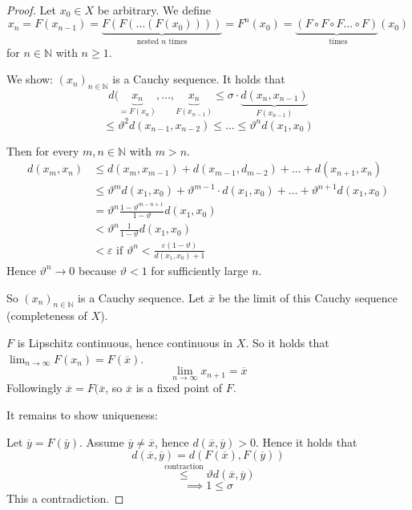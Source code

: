 \documentclass[a4paper,landscape,twocolumn]{article}
\theoremstyle{definition}
\begin{document}
\begin{proof}
  Let $x_0 \in X$ be arbitrary.
  We define
  \[
  x_n = F(x_{n-1}) = \underbrace{F(F(\ldots(F(x_0))))}_{\text{nested } n \text{ times}}
  = F^{n}(x_0) = \underbrace{(F \circ F \circ F \ldots \circ F)}_{ \text{ times}}(x_0)
  \]
  for $n \in \mathbb N$ with $n \geq 1$.

  We show: $(x_n)_{n\in\mathbb N}$ is a Cauchy sequence. It holds that
  \[ d(\underbrace{x_n}_{=F(x_n)}, \ldots, \underbrace{x_n}_{F(x_{n-1})} \leq \sigma \cdot \underbrace{d(x_n, x_{n-1})}_{F(x_{n-1})} \]
  \[ \leq \vartheta^2 d(x_{n-1}, x_{n-2}) \leq \ldots \leq \vartheta^n d(x_1, x_0) \]

  Then for every $m,n \in \mathbb N$ with $m > n$.
  \begin{align*}
    d(x_m, x_n) &\leq d(x_m, x_{m-1}) + d(x_{m-1}, d_{m-2}) + \ldots + d(x_{n+1}, x_n) \\
    &\leq \vartheta^m d(x_1, x_0) + \vartheta^{m-1} \cdot d(x_1, x_0) + \ldots + \vartheta^{n+1} d(x_1, x_0) \\
    &= \vartheta^{n} \frac{1 - \vartheta^{m-n+1}}{1 - \vartheta} d(x_1, x_0) \\
    &< \vartheta^{n} \frac{1}{1 - \vartheta} d(x_1, x_0) \\
    &< \varepsilon \text{ if } \vartheta^n < \frac{\varepsilon (1 - \vartheta)}{d(x_1, x_0) + 1}
  \end{align*}
  Hence $\vartheta^n \to 0$ because $\vartheta < 1$ for sufficiently large $n$.

  So $(x_n)_{n \in \mathbb N}$ is a Cauchy sequence. Let $\overline{x}$ be the limit
  of this Cauchy sequence (completeness of $X$).

  $F$ is Lipschitz continuous, hence continuous in $X$.
  So it holds that $\lim_{n\to\infty} F(x_n) = F(\overline{x})$.
  \[ \lim_{n\to\infty} x_{n+1} = \overline{x} \]
  Followingly $\overline{x} = F(\overline{x}$, so $\overline{x}$ is a fixed point
  of $F$.

  It remains to show uniqueness:

  Let $\overline{y} = F(\overline{y})$. Assume $\overline{y} \neq \overline{x}$,
  hence $d(\overline{x}, \overline{y}) > 0$. Hence it holds that
  \[ d(\overline{x}, \overline{y}) = d(F(\overline{x}), F(\overline{y})) \]
  \[ \overset{\text{contraction}}{\leq} \vartheta d(\overline{x}, \overline{y}) \]
  \[ \implies 1 \leq \sigma \]
  This a contradiction.
\end{proof}
\end{document}
